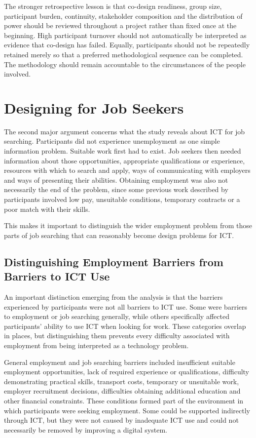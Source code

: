 The stronger retrospective lesson is that co-design readiness, group size, participant burden, continuity, stakeholder composition and the distribution of power should be reviewed throughout a project rather than fixed once at the beginning. High participant turnover should not automatically be interpreted as evidence that co-design has failed. Equally, participants should not be repeatedly retained merely so that a preferred methodological sequence can be completed. The methodology should remain accountable to the circumstances of the people involved.


\section{Designing for Job Seekers}

The second major argument concerns what the study reveals about ICT for job searching. Participants did not experience unemployment as one simple information problem. Suitable work first had to exist. Job seekers then needed information about those opportunities, appropriate qualifications or experience, resources with which to search and apply, ways of communicating with employers and ways of presenting their abilities. Obtaining employment was also not necessarily the end of the problem, since some previous work described by participants involved low pay, unsuitable conditions, temporary contracts or a poor match with their skills.

This makes it important to distinguish the wider employment problem from those parts of job searching that can reasonably become design problems for ICT.


\subsection{Distinguishing Employment Barriers from Barriers to ICT Use}

An important distinction emerging from the analysis is that the barriers experienced by participants were not all barriers to ICT use. Some were barriers to employment or job searching generally, while others specifically affected participants' ability to use ICT when looking for work. These categories overlap in places, but distinguishing them prevents every difficulty associated with employment from being interpreted as a technology problem.

General employment and job searching barriers included insufficient suitable employment opportunities, lack of required experience or qualifications, difficulty demonstrating practical skills, transport costs, temporary or unsuitable work, employer recruitment decisions, difficulties obtaining additional education and other financial constraints. These conditions formed part of the environment in which participants were seeking employment. Some could be supported indirectly through ICT, but they were not caused by inadequate ICT use and could not necessarily be removed by improving a digital system.

